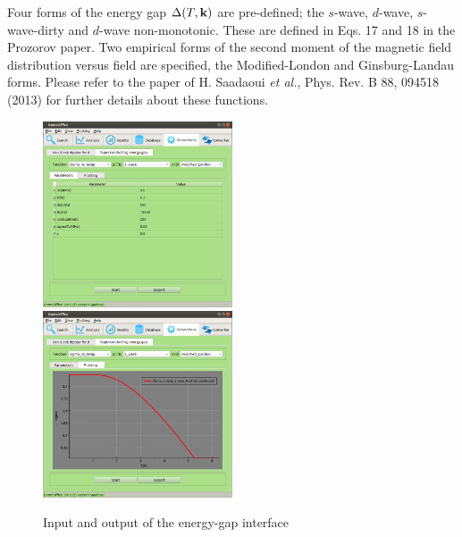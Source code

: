 \documentclass[10pt,letterpaper,oneside]{article}
\newcommand{\etal}{{\it et al.}}
\begin{document}
Four forms of the energy gap $\Delta(T,{\bf k})$ are pre-defined; the $s$-wave, $d$-wave, $s$-wave-dirty and $d$-wave non-monotonic.  These are defined in Eqs. 17 and 18 in the Prozorov paper. Two empirical forms of the second moment of the magnetic field distribution versus field are specified, the Modified-London and Ginsburg-Landau forms. Please refer to the paper of H. Saadaoui \etal, Phys. Rev. B 88, 094518 (2013) for further details about these functions.

\begin{figure}[h]
\includegraphics[width=0.5\textwidth]{sim-eg-in.png}
\includegraphics[width=0.5\textwidth]{sim-eg-out.png}
 \caption{Input and output of the energy-gap interface}
 \label{fig-mag}
 \end{figure}

 \clearpage
\end{document}
